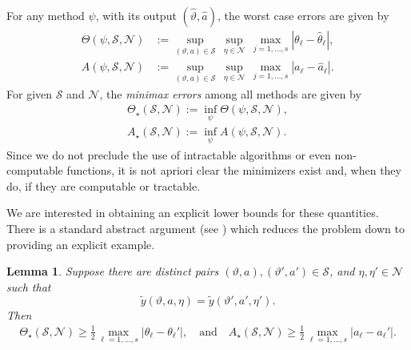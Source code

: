 \documentclass[11pt]{article}
\newtheorem{lemma}[theorem]{Lemma}
\theoremstyle{definition}
\numberwithin{theorem}{section}
\numberwithin{lemma}{section}
\numberwithin{equation}{section}
\renewcommand{\hat}{\widehat}
\renewcommand{\tilde}{\widetilde}
\newcommand{\bfa}{a}
\newcommand{\calS}{\mathcal{S}}
\newcommand{\calN}{\mathcal{N}}
\def\andspace{\quad\text{and}\quad}
\numberwithin{equation}{section}
\begin{document}
	For any method $\psi$, with its output $(\hat\vartheta,\hat\bfa)$,  the worst case  errors are given by
	\begin{align*}
		\Theta(\psi,\calS,\calN)&:=\sup_{(\vartheta,\bfa)\in \calS} \, \sup_{\eta\in\calN} \,  \max_{j=1,\dots,s} |\theta_\ell-\hat \theta_\ell|, \\
		A(\psi,\calS,\calN)&:=\sup_{(\vartheta,\bfa)\in \calS} \, \sup_{\eta\in\calN} \,  \max_{j=1,\dots,s} |a_\ell-\hat a_\ell|.
	\end{align*}
	For given $\calS$ and $\calN$, the {\it minimax errors }  among all methods are given by
	\begin{align*}
		\Theta_\star(\calS,\calN):=\inf_{\psi} \Theta(\psi,\calS,\calN), \\
		A_\star(\calS,\calN):=\inf_{\psi} A(\psi,\calS,\calN). 
	\end{align*}
	Since we do not preclude the use of intractable algorithms or even non-computable functions, it is not apriori clear  the minimizers exist and, when they do, if they are computable or tractable.  
	
	We are interested in obtaining an explicit lower bounds for these quantities. There is a standard abstract argument (see \cite{batenkov2021super,li2021stable,fannjiang2025optimality}) which reduces the problem down to providing an explicit example. 
	
	\begin{lemma} \label{lem:minmaxhelp}
		Suppose there are distinct pairs $(\vartheta,\bfa),(\vartheta',\bfa')\in \calS$, and $\eta,\eta' \in \calN$ such that 
		\begin{equation}
			\label{eq:data}
			\tilde y(\vartheta,\bfa,\eta)
			=\tilde y(\vartheta',\bfa',\eta').
		\end{equation}
		Then 
		\begin{align*}
			\Theta_\star(\calS,\calN)
			\geq \frac 1 2 \max_{\ell=1,\dots,s} |\theta_\ell-\theta_\ell'|, \andspace 
			A_\star(\calS,\calN)
			\geq \frac 1 2 \max_{\ell=1,\dots,s} |a_\ell-a_\ell'|.
		\end{align*}
	\end{lemma}
	
\end{document}

